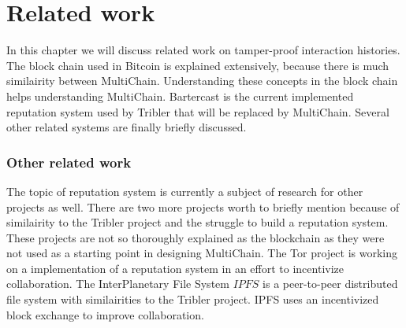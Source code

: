 \chapter{Related work}
In this chapter we will discuss related work on tamper-proof interaction histories.
The block chain used in Bitcoin is explained extensively,
because there is much similairity between MultiChain.
Understanding these concepts in the block chain helps understanding MultiChain.
Bartercast is the current implemented reputation system used by Tribler that will be replaced by MultiChain.
Several other related systems are finally briefly discussed.





\subsection{Other related work}
The topic of reputation system is currently a subject of research for other projects as well.
There are two more projects worth to briefly mention because of similairity to the Tribler project
and the struggle to build a reputation system.
These projects are not so thoroughly explained as the blockchain
as they were not used as a starting point in designing MultiChain.
The Tor project is working on a implementation of a reputation system
in an effort to incentivize collaboration\cite{androulaki-torincentive}\cite{chen-torincentive}\cite{dingledine-torincentive}\cite{ghosh-torincentive}\cite{jansen-torincentive}.
The InterPlanetary File System \(IPFS\) is a peer-to-peer distributed file system with similairities to the Tribler project.
IPFS uses an incentivized block exchange to improve collaboration\cite{benet-ipfs}.